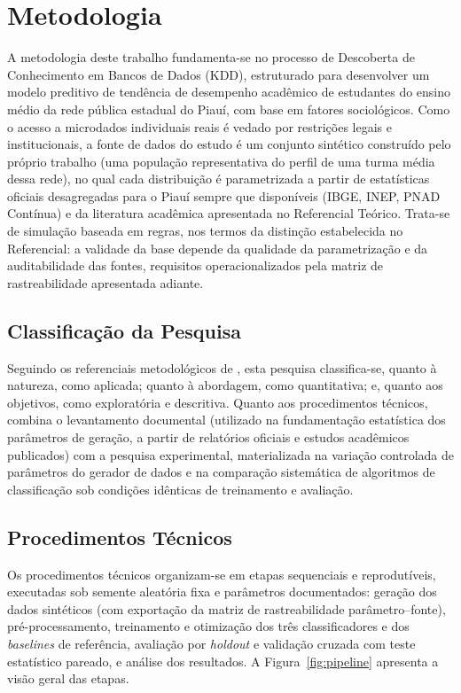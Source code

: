 \chapter{Metodologia}

A metodologia deste trabalho fundamenta-se no processo de Descoberta de Conhecimento em Bancos de Dados (KDD), estruturado para desenvolver um modelo preditivo de tendência de desempenho acadêmico de estudantes do ensino médio da rede pública estadual do Piauí, com base em fatores sociológicos. Como o acesso a microdados individuais reais é vedado por restrições legais e institucionais, a fonte de dados do estudo é um conjunto sintético construído pelo próprio trabalho (uma população representativa do perfil de uma turma média dessa rede), no qual cada distribuição é parametrizada a partir de estatísticas oficiais desagregadas para o Piauí sempre que disponíveis (IBGE, INEP, PNAD Contínua) e da literatura acadêmica apresentada no Referencial Teórico. Trata-se de simulação baseada em regras, nos termos da distinção estabelecida no Referencial: a validade da base depende da qualidade da parametrização e da auditabilidade das fontes, requisitos operacionalizados pela matriz de rastreabilidade apresentada adiante.

\section{Classificação da Pesquisa}

Seguindo os referenciais metodológicos de , esta pesquisa classifica-se, quanto à natureza, como aplicada; quanto à abordagem, como quantitativa; e, quanto aos objetivos, como exploratória e descritiva. Quanto aos procedimentos técnicos, combina o levantamento documental (utilizado na fundamentação estatística dos parâmetros de geração, a partir de relatórios oficiais e estudos acadêmicos publicados) com a pesquisa experimental, materializada na variação controlada de parâmetros do gerador de dados e na comparação sistemática de algoritmos de classificação sob condições idênticas de treinamento e avaliação.

\section{Procedimentos Técnicos}

Os procedimentos técnicos organizam-se em etapas sequenciais e reprodutíveis, executadas sob semente aleatória fixa e parâmetros documentados: geração dos dados sintéticos (com exportação da matriz de rastreabilidade parâmetro--fonte), pré-processamento, treinamento e otimização dos três classificadores e dos \textit{baselines} de referência, avaliação por \textit{holdout} e validação cruzada com teste estatístico pareado, e análise dos resultados. A Figura~\ref{fig:pipeline} apresenta a visão geral das etapas.

